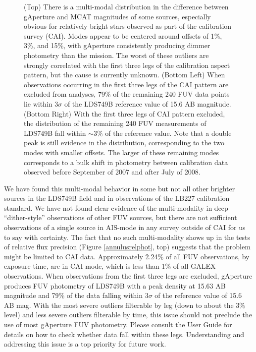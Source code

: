 \documentclass[preprint]{aastex}
\begin{document}
\begin{figure}[h]
\caption{(Top) There is a multi-modal distribution in the difference between gAperture and MCAT magnitudes of some sources, especially obvious for relatively bright stars observed as part of the calibration survey (CAI). Modes appear to be centered around offsets of 1\%, 3\%, and 15\%, with gAperture consistently producing dimmer photometry than the mission. The worst of these outliers are strongly correlated with the first three legs of the calibration aspect pattern, but the cause is currently unknown. (Bottom Left) When observations occurring in the first three legs of the CAI pattern are excluded from analyses, 79\% of the remaining 240 FUV data points lie within 3$\sigma$ of the LDS749B reference value of 15.6 AB magnitude. (Bottom Right) With the first three legs of CAI pattern excluded, the distribution of the remaining 240 FUV measurements of LDS749B fall within $\sim3\%$ of the reference value. Note that a double peak is still evidence in the distribution, corresponding to the two modes with smaller offsets. The larger of these remaining modes corresponds to a bulk shift in photometry between calibration data observed before September of 2007 and after July of 2008.
\label{multimodal}}
\end{figure}
\clearpage

We have found this multi-modal behavior in some but not all other brighter sources in the LDS749B field and in observations of the LB227 calibration standard. We have not found clear evidence of the multi-modality in deep ``dither-style'' observations of other FUV sources, but there are not sufficient observations of a single source in AIS-mode in any survey outside of CAI for us to say with certainty. The fact that no such multi-modality shows up in the tests of relative flux precision (Figure \ref{annulusrelphot}, top) suggests that the problem might be limited to CAI data. Approximately 2.24\% of all FUV observations, by exposure time, are in CAI mode, which is less than 1\% of all GALEX observations. When observations from the first three legs are excluded, gAperture produces FUV photometry of LDS749B with a peak density at 15.63 AB magnitude and 79\% of the data falling within 3$\sigma$ of the reference value of 15.6 AB mag. With the most severe outliers filterable by leg (down to about the $3$\% level) and less severe outliers filterable by time, this issue should not preclude the use of most gAperture FUV photometry. Please consult the User Guide for details on how to check whether data fall within these legs. Understanding and addressing this issue is a top priority for future work.
\end{document}
